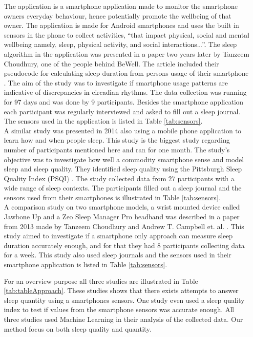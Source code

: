 \documentclass[12pt]{article} %
\begin{document}
The application is a smartphone application made to monitor the smartphone owners everyday behaviour, hence potentially promote the wellbeing of that owner. The application is made for Android smartphones and uses the built in sensors in the phone to collect activities, ``that impact physical, social and mental wellbeing namely, sleep, physical activity, and social interactions...''\cite{beWell}. The sleep algorithm in the application was presented in a paper two years later by Tanzeem Choudhury, one of the people behind BeWell. The article included their pseudocode for calculating sleep duration from persons usage of their smartphone \cite{bewellSleep}. The aim of the study was to investigate if smartphone usage patterns are indicative of discrepancies in circadian rhythms. The data collection was running for 97 days and was done by 9 participants. Besides the smartphone application each participant was regularly interviewed and asked to fill out a sleep journal. The sensors used in the application is listed in Table \ref{tab:sensors}.\\ 

A similar study was presented in 2014 \cite{toss} also using a mobile phone application to learn how and when people sleep. This study is the biggest study regarding number of participants mentioned here and ran for one month. The study's objective was to investigate how well a commodity smartphone sense and model sleep and sleep quality. They identified sleep quality using the Pittsburgh Sleep Quality Index (PSQI) \cite{quality}. The study collected data from 27 participants with a wide range of sleep contexts.  The participants filled out a sleep journal and the sensors used from their smartphones is illustrated in Table \ref{tab:sensors}. \\

A comparison study on two smartphone models, a wrist mounted device called Jawbone Up and a Zeo Sleep Manager Pro headband was described in a paper from 2013 made by Tanzeem Choudhury and Andrew T. Campbell et. al. \cite{compare}. This study aimed to investigate if a smartphone only approach can measure sleep duration accurately enough, and for that they had 8 participants collecting data for a week. This study also used sleep journals and the sensors used in their smartphone application is listed in Table \ref{tab:sensors}. 

For an overview purpose all three studies are illustrated in Table \ref{tab:tableApproach}. These studies shows that there exists attempts to answer sleep quantity using a smartphones sensors. One study even used a sleep quality index to test if values from the smartphone sensors was accurate enough. All three studies used Machine Learning in their analysis of the collected data. Our method focus on both sleep quality and quantity. 
\end{document}
